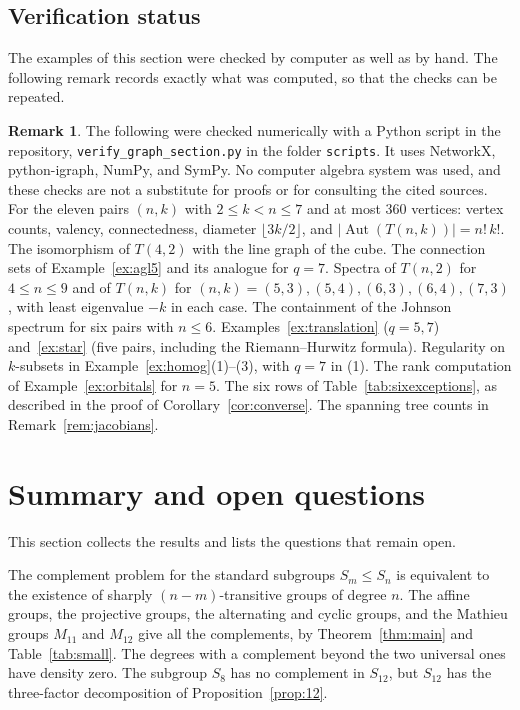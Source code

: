 \documentclass[12pt,letterpaper]{article}
\numberwithin{equation}{section}
\theoremstyle{definition}
\newtheorem{vremark}{Remark}
\DeclareMathOperator{\autt}{Aut}
\begin{document}
\subsection*{Verification status}
The examples of this section were checked by computer as well as by hand. The following remark records exactly what was computed, so that the checks can be repeated.
\begin{vremark}\label{rem:graphchecks}
The following were checked numerically with a Python script in the repository, \texttt{verify\_graph\_section.py} in the folder \texttt{scripts}. It uses NetworkX, python-igraph, NumPy, and SymPy. No computer algebra system was used, and these checks are not a substitute for proofs or for consulting the cited sources. For the eleven pairs $(n,k)$ with $2\leq k<n\leq 7$ and at most $360$ vertices: vertex counts, valency, connectedness, diameter $\lfloor3k/2\rfloor$, and $|\autt(T(n,k))|=n!\,k!$. The isomorphism of $T(4,2)$ with the line graph of the cube. The connection sets of Example~\ref{ex:agl5} and its analogue for $q=7$. Spectra of $T(n,2)$ for $4\leq n\leq9$ and of $T(n,k)$ for $(n,k)=(5,3),(5,4),(6,3),(6,4),(7,3)$, with least eigenvalue $-k$ in each case. The containment of the Johnson spectrum for six pairs with $n\leq6$. Examples~\ref{ex:translation} ($q=5,7$) and~\ref{ex:star} (five pairs, including the Riemann--Hurwitz formula). Regularity on $k$-subsets in Example~\ref{ex:homog}(1)--(3), with $q=7$ in (1). The rank computation of Example~\ref{ex:orbitals} for $n=5$. The six rows of Table~\ref{tab:sixexceptions}, as described in the proof of Corollary~\ref{cor:converse}. The spanning tree counts in Remark~\ref{rem:jacobians}.
\end{vremark}

\section{Summary and open questions}\label{sec:summary}
This section collects the results and lists the questions that remain open.

The complement problem for the standard subgroups $S_m\leq S_n$ is equivalent to the existence of sharply $(n-m)$-transitive groups of degree $n$. The affine groups, the projective groups, the alternating and cyclic groups, and the Mathieu groups $M_{11}$ and $M_{12}$ give all the complements, by Theorem~\ref{thm:main} and Table~\ref{tab:small}. The degrees with a complement beyond the two universal ones have density zero. The subgroup $S_8$ has no complement in $S_{12}$, but $S_{12}$ has the three-factor decomposition of Proposition~\ref{prop:12}.
\end{document}
